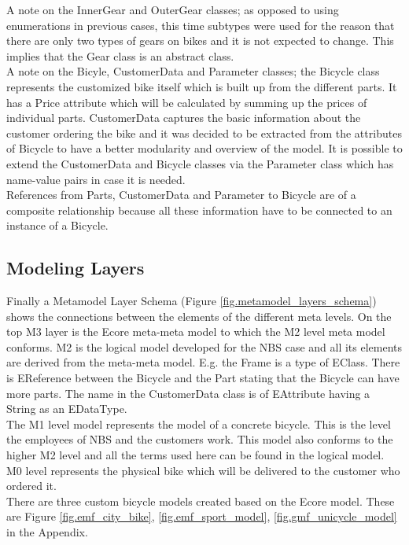 \noindent A note on the InnerGear and OuterGear classes; as opposed 
to using enumerations in previous cases, this time subtypes were used 
for the reason that there are only two types of gears on bikes and 
it is not expected to change. This implies that the Gear class is an 
abstract class.\\

\noindent A note on the Bicyle, CustomerData and Parameter classes; 
the Bicycle class represents the customized bike itself which is 
built up from the different parts. It has a Price attribute which 
will be calculated by summing up the prices of individual parts. 
CustomerData captures the basic information about the customer 
ordering the bike and it was decided to be extracted from the 
attributes of Bicycle to have a better modularity and overview of 
the model. It is possible to extend the CustomerData and Bicycle 
classes via the Parameter class which has name-value pairs in case 
it is needed.\\

\noindent References from Parts, CustomerData and Parameter to Bicycle 
are of a composite relationship because all these information have to 
be connected to an instance of a Bicycle.\\

\subsection{Modeling Layers}

\noindent Finally a Metamodel Layer Schema (Figure \ref{fig.metamodel_layers_schema}) shows the connections
between the elements of the different meta levels. On the top M3 layer is
the Ecore meta-meta model to which the M2 level meta model conforms. 
M2 is the logical model developed for the NBS case and all its elements are
derived from the meta-meta model. E.g. the Frame is a type of EClass. There is 
EReference between the Bicycle and the Part stating that the Bicycle can have
more parts. The name in the CustomerData class is of EAttribute having a 
String as an EDataType.\\
The M1 level model represents the model of a concrete bicycle. This is 
the level the employees of NBS and the customers work. This model also
conforms to the higher M2 level and all the terms used here can be found 
in the logical model.\\
M0 level represents the physical bike which will be delivered to the
customer who ordered it.\\
There are three custom bicycle models created based on the Ecore model. These
are Figure \ref{fig.emf_city_bike}, \ref{fig.emf_sport_model}, \ref{fig.gmf_unicycle_model} in
the Appendix.
